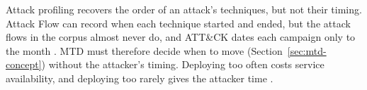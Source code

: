 \documentclass{cshonours}
\begin{document}
Attack profiling recovers the order of an attack's techniques, but not
their timing. Attack Flow can record when each technique started and
ended, but the attack flows in the corpus almost never do, and ATT\&CK dates each
campaign only to the month \citep{ctid2025attackflow, mitre2026attackkb}.
MTD must therefore decide when to move (Section~\ref{sec:mtd-concept})
without the attacker's timing. Deploying too often costs service
availability, and deploying too rarely gives the attacker time
\citep{cho2020}.
\end{document}
